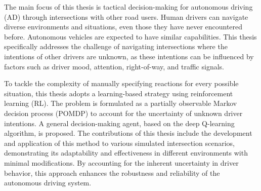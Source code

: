 The main focus of this thesis is tactical decision-making for autonomous driving (AD) through intersections with other road users. Human drivers can navigate diverse environments and situations, even those they have never encountered before. Autonomous vehicles are expected to have similar capabilities. This thesis specifically addresses the challenge of navigating intersections where the intentions of other drivers are unknown, as these intentions can be influenced by factors such as driver mood, attention, right-of-way, and traffic signals.

To tackle the complexity of manually specifying reactions for every possible situation, this thesis adopts a learning-based strategy using reinforcement learning (RL). The problem is formulated as a partially observable Markov decision process (POMDP) to account for the uncertainty of unknown driver intentions. A general decision-making agent, based on the deep Q-learning algorithm, is proposed. The contributions of this thesis include the development and application of this method to various simulated intersection scenarios, demonstrating its adaptability and effectiveness in different environments with minimal modifications. By accounting for the inherent uncertainty in driver behavior, this approach enhances the robustness and reliability of the autonomous driving system.



